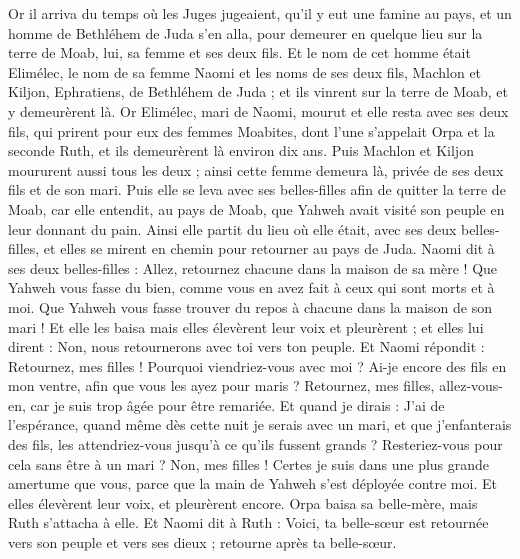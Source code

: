 \begin{multicols}{2}
\VerseOne{}Or il arriva du temps où les Juges jugeaient, qu'il y eut une famine au pays, et un homme de Bethléhem de Juda s'en alla, pour demeurer en quelque lieu sur la terre de Moab, lui, sa femme et ses deux fils.
Et le nom de cet homme était Elimélec, le nom de sa femme Naomi et les noms de ses deux fils, Machlon et Kiljon, Ephratiens, de Bethléhem de Juda ; et ils vinrent sur la terre de Moab, et y demeurèrent là.
Or Elimélec, mari de Naomi, mourut et elle resta avec ses deux fils,
qui prirent pour eux des femmes Moabites, dont l'une s'appelait Orpa et la seconde Ruth, et ils demeurèrent là environ dix ans.
Puis Machlon et Kiljon moururent aussi tous les deux ; ainsi cette femme demeura là, privée de ses deux fils et de son mari.
Puis elle se leva avec ses belles-filles afin de quitter la terre de Moab, car elle entendit, au pays de Moab, que Yahweh avait visité son peuple en leur donnant du pain.
Ainsi elle partit du lieu où elle était, avec ses deux belles-filles, et elles se mirent en chemin pour retourner au pays de Juda.
Naomi dit à ses deux belles-filles : Allez, retournez chacune dans la maison de sa mère ! Que Yahweh vous fasse du bien, comme vous en avez fait à ceux qui sont morts et à moi.
Que Yahweh vous fasse trouver du repos à chacune dans la maison de son mari ! Et elle les baisa mais elles élevèrent leur voix et pleurèrent ;
et elles lui dirent : Non, nous retournerons avec toi vers ton peuple.
Et Naomi répondit : Retournez, mes filles ! Pourquoi viendriez-vous avec moi ? Ai-je encore des fils en mon ventre, afin que vous les ayez pour maris ?
Retournez, mes filles, allez-vous-en, car je suis trop âgée pour être remariée. Et quand je dirais : J'ai de l'espérance, quand même dès cette nuit je serais avec un mari, et que j'enfanterais des fils,
les attendriez-vous jusqu'à ce qu'ils fussent grands ? Resteriez-vous pour cela sans être à un mari ? Non, mes filles ! Certes je suis dans une plus grande amertume que vous, parce que la main de Yahweh s’est déployée contre moi.
Et elles élevèrent leur voix, et pleurèrent encore. Orpa baisa sa belle-mère, mais Ruth s'attacha à elle.
Et Naomi dit à Ruth : Voici, ta belle-sœur est retournée vers son peuple et vers ses dieux ; retourne après ta belle-sœur.

\end{multicols}
